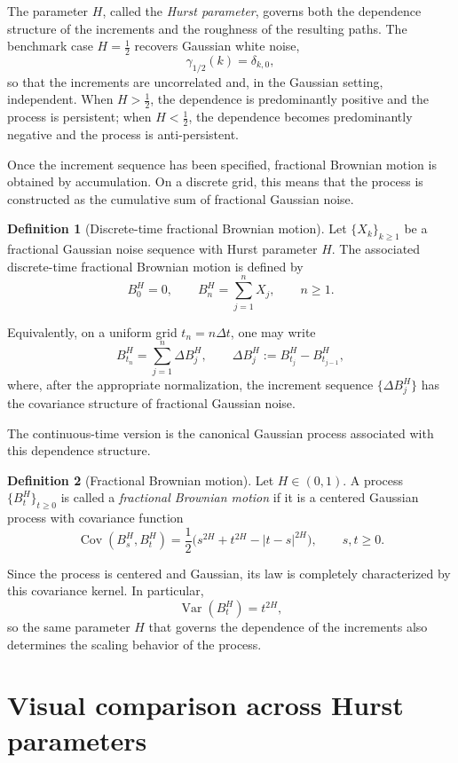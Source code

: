 \documentclass[a4paper,10pt,titlepage,oneside,openany]{book}
\theoremstyle{plain}
\theoremstyle{definition}
\newtheorem{definition}{Definition}[chapter]
\theoremstyle{remark}
\newcommand{\Var}{\operatorname{Var}}
\newcommand{\Cov}{\operatorname{Cov}}
\newcommand{\1}{\mathbf{1}}
\begin{document}
The parameter \(H\), called the \emph{Hurst parameter}, governs both the dependence structure of the increments and the roughness of the resulting paths. The benchmark case \(H=\tfrac12\) recovers Gaussian white noise,
\[
\gamma_{1/2}(k)=\delta_{k,0},
\]
so that the increments are uncorrelated and, in the Gaussian setting, independent. When \(H>\tfrac12\), the dependence is predominantly positive and the process is persistent; when \(H<\tfrac12\), the dependence becomes predominantly negative and the process is anti-persistent.

Once the increment sequence has been specified, fractional Brownian motion is obtained by accumulation. On a discrete grid, this means that the process is constructed as the cumulative sum of fractional Gaussian noise.

\begin{definition}[Discrete-time fractional Brownian motion]
Let \(\{X_k\}_{k\ge 1}\) be a fractional Gaussian noise sequence with Hurst parameter \(H\). The associated discrete-time fractional Brownian motion is defined by
\[
B_0^H=0,
\qquad
B_n^H=\sum_{j=1}^{n}X_j,
\qquad n\ge 1.
\]
\end{definition}

Equivalently, on a uniform grid \(t_n=n\Delta t\), one may write
\[
B^H_{t_n}
=
\sum_{j=1}^{n}\Delta B_j^H,
\qquad
\Delta B_j^H:=B^H_{t_j}-B^H_{t_{j-1}},
\]
where, after the appropriate normalization, the increment sequence \(\{\Delta B_j^H\}\) has the covariance structure of fractional Gaussian noise.

The continuous-time version is the canonical Gaussian process associated with this dependence structure.

\begin{definition}[Fractional Brownian motion]
Let \(H\in(0,1)\). A process \(\{B_t^H\}_{t\ge 0}\) is called a \emph{fractional Brownian motion} if it is a centered Gaussian process with covariance function
\[
\Cov(B_s^H,B_t^H)
=
\frac{1}{2}
\bigl(
s^{2H}+t^{2H}-|t-s|^{2H}
\bigr),
\qquad s,t\ge 0.
\]
\end{definition}

Since the process is centered and Gaussian, its law is completely characterized by this covariance kernel. In particular,
\[
\Var(B_t^H)=t^{2H},
\]
so the same parameter \(H\) that governs the dependence of the increments also determines the scaling behavior of the process.

\section{Visual comparison across Hurst parameters}
\end{document}
